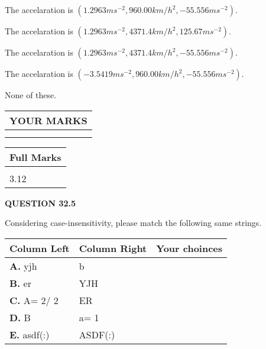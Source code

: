 \documentclass[12pt]{article}
\begin{document}
 
The accelaration is
$(
1.2963ms^{-2},
960.00km/h^2,
-55.556ms^{-2}
).
$
 
 
The accelaration is
$(
1.2963ms^{-2},
4371.4km/h^2,
125.67ms^{-2}
).
$
 
 
The accelaration is
$(
1.2963ms^{-2},
4371.4km/h^2,
-55.556ms^{-2}
).
$
 
 
The accelaration is
$(
-3.5419ms^{-2},
960.00km/h^2,
-55.556ms^{-2}
).
$
 
 
 None of these.
 
 
 
 

 
\vspace{0.3in}
  
\vspace{0.2in}
  
\noindent\begin{tabular}{|l|}
\hline
 YOUR MARKS  \\
\hline
 \\ 
 \\ 
\hline
\end{tabular}
\hspace{0.05in} \begin{tabular}{|l|}
\hline
 Full Marks  \\
\hline
 \\ 
3.12 \\
\hline
\end{tabular}
{\textbf{\Large{QUESTION
32.5 
}}}
  
  
Considering case-insensitivity, please match the following same strings.
  
  
\begin{tabular}{|l|l|l|}
 \hline
 Column Left & Column Right  & Your choinces \\ 
 \hline
{\textbf{\large{
A.}}}
yjh
  & 
b
 & 
 \\ 
 \hline
{\textbf{\large{
B.}}}
er
  & 
YJH
 & 
 \\ 
 \hline
{\textbf{\large{
C.}}}
 A= %
2/ %
2

  & 
ER
 & 
 \\ 
 \hline
{\textbf{\large{
D.}}}
B
  & 
 a= %
1
 & 
 \\ 
 \hline
{\textbf{\large{
E.}}}
asdf(:)
  & 
ASDF(:)
 & 
 \\ 
 \hline
 \end{tabular}
  
  
 
\end{document}
